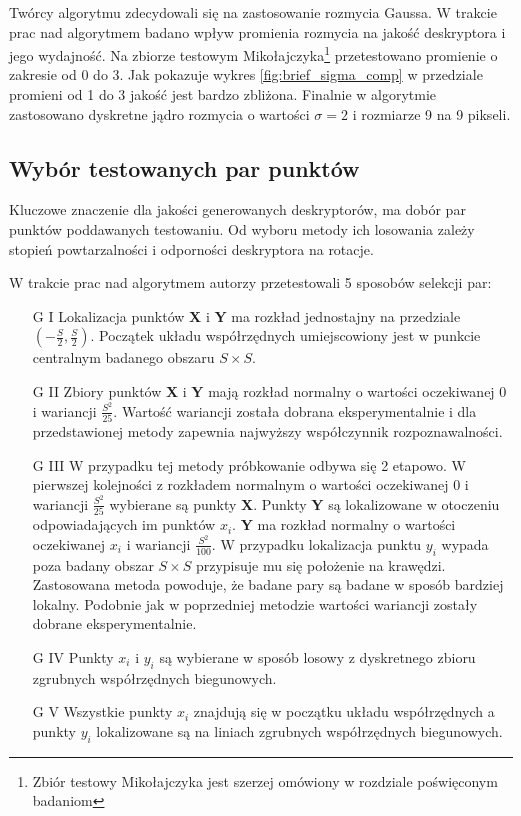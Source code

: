 Twórcy algorytmu zdecydowali się na zastosowanie rozmycia Gaussa. W trakcie prac nad algorytmem badano wpływ promienia rozmycia na jakość deskryptora i jego wydajność. Na zbiorze testowym Mikołajczyka\footnote{Zbiór testowy Mikołajczyka jest szerzej omówiony w rozdziale poświęconym badaniom} przetestowano promienie o zakresie od 0 do 3. Jak pokazuje wykres \ref{fig:brief_sigma_comp} w przedziale promieni od 1 do 3 jakość jest bardzo zbliżona. Finalnie w algorytmie zastosowano dyskretne jądro rozmycia o wartości $\sigma = 2 $ i rozmiarze 9 na 9 pikseli.

\subsection{Wybór testowanych par punktów}
Kluczowe znaczenie dla jakości generowanych deskryptorów, ma dobór par punktów poddawanych testowaniu. Od wyboru metody ich losowania zależy stopień powtarzalności i odporności deskryptora na rotacje. 

W trakcie prac nad algorytmem autorzy przetestowali 5 sposobów selekcji par:
\begin{enumerate}
\item[G I] Lokalizacja punktów \textbf{X} i \textbf{Y} ma rozkład jednostajny na przedziale $(-\frac{S}{2},\frac{S}{2})$. Początek układu współrzędnych umiejscowiony jest w punkcie centralnym badanego obszaru $S\times S$. 
\item[G II] Zbiory punktów \textbf{X} i \textbf{Y} mają rozkład normalny o wartości oczekiwanej 0 i wariancji $\frac{S^2}{25}$. Wartość wariancji została dobrana eksperymentalnie i dla przedstawionej metody zapewnia najwyższy współczynnik rozpoznawalności.
\item[G III] W przypadku tej metody próbkowanie odbywa się 2 etapowo. W pierwszej kolejności z rozkładem normalnym o wartości oczekiwanej 0 i wariancji $\frac{S^2}{25}$ wybierane są punkty \textbf{X}. Punkty \textbf{Y} są lokalizowane w otoczeniu odpowiadających im punktów $x_i$.  \textbf{Y} ma rozkład normalny o wartości oczekiwanej $x_i$ i wariancji $\frac{S^2}{100}$. W przypadku lokalizacja punktu $y_i$ wypada poza badany obszar $S\times S$ przypisuje mu się położenie na krawędzi. Zastosowana metoda powoduje, że badane pary są badane w sposób bardziej lokalny. Podobnie jak w poprzedniej metodzie wartości wariancji zostały dobrane eksperymentalnie.
\item[G IV] Punkty $x_i$ i $y_i$ są wybierane w sposób losowy z dyskretnego zbioru zgrubnych współrzędnych biegunowych.
\item[G V] Wszystkie punkty $x_i$ znajdują się w początku układu współrzędnych a punkty $y_i$ lokalizowane są na liniach zgrubnych współrzędnych biegunowych.
\end{enumerate}

